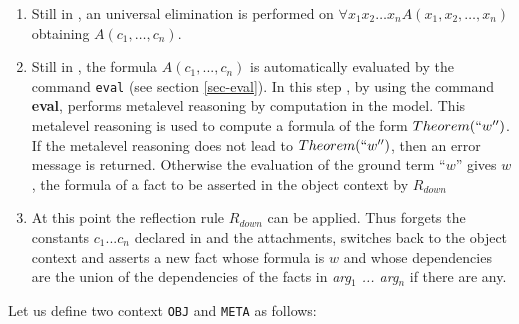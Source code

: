 {\begin{enumerate}
     returned by parsing , , \SEQ,  respectively.
     The representation associated to these constants is the representation
     declared for their sorts (see the command {\bf represent}, section
     \ref{sec-rep-sort}).
   \item 
     Still in {\meta}, an universal elimination is performed on 
     $\forall x_1 x_2\ldots x_n A(x_1, x_2,\ldots,x_n)$ obtaining
     $A(c_1, \ldots ,c_n)$.
   \item 
     Still in {\meta}, the formula $A(c_1,...,c_n)$ is automatically evaluated
     by the command {\tt eval} (see section \ref{sec-eval}).
     In this step {\GF}, by using the command {\bf eval}, performs metalevel
     reasoning by computation in the model.
     This metalevel reasoning is used to compute a formula of the form 
     $Theorem(``w'')$.
     If the metalevel reasoning does not lead to $Theorem(``w'')$, then an error
     message is returned. Otherwise the evaluation of the ground term ``$w$''
     gives $w$, the formula of a fact to be asserted in the object context by
     $R_{down}$
   \item
     At this point the reflection rule $R_{down}$ can be applied.
     Thus {\GF} forgets the constants $c_1 ... c_n$ declared in {\meta} and the
     attachments, switches back to the object context and asserts a new fact
     whose formula is $w$ and whose dependencies are the union of the 
     dependencies of the facts in {\em arg$_1$ ... arg$_n$} if there are any.
   \end{enumerate}

	Let us define two context {\tt OBJ} and {\tt META} as follows:


}
